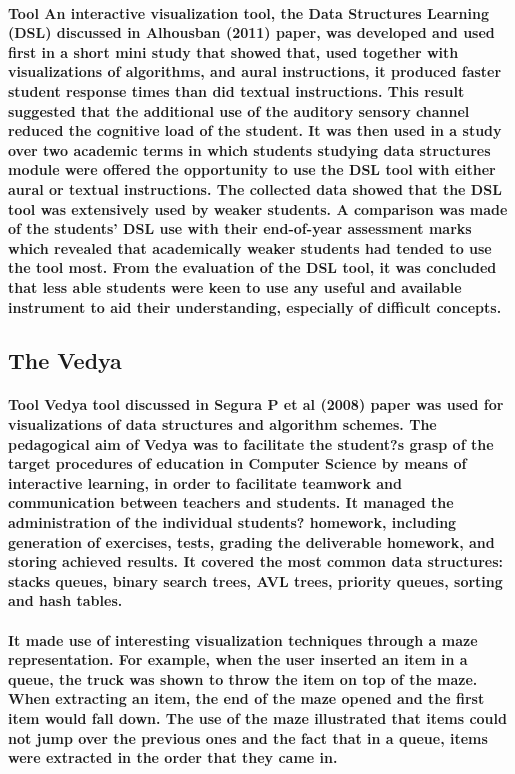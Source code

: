 \documentclass{article}
\begin{document}
\paragraph{Tool An interactive visualization tool, the Data Structures Learning (DSL) discussed in Alhousban (2011) paper\cite{kumar2017conceptualization}, was developed and used first in a short mini study that showed that, used together with visualizations of algorithms, and aural instructions, it produced faster student response times than did textual instructions. This result suggested that the additional use of the auditory sensory channel reduced the cognitive load of the student. It was then used in a study over two academic terms in which students studying data structures module were offered the opportunity to use the DSL tool with either aural or textual instructions. The collected data showed that the DSL tool was extensively used by weaker students. A comparison was made of the students' DSL use with their end-of-year assessment marks which revealed that academically weaker students had tended to use the tool most. From the evaluation of the DSL tool, it was concluded that less able students were keen to use any useful and available instrument to aid their understanding, especially of difficult concepts.}
\subsection{The Vedya}
\paragraph{Tool Vedya tool discussed in Segura P et al (2008) paper was used for visualizations of data structures and algorithm schemes. \cite{patel2014literature}The pedagogical aim of Vedya was to facilitate the student?s grasp of the target procedures of education in Computer Science by means of interactive learning, in order to facilitate teamwork and communication between teachers and students. It managed the administration of the individual students? homework, including generation of exercises, tests, grading the deliverable homework, and storing achieved results. It covered the most common data structures: stacks queues, binary search trees, AVL trees, priority queues, sorting and hash tables. }
\paragraph{It made use of interesting visualization techniques through a maze representation. For example, when the user inserted an item in a queue, the truck was shown to throw the item on top of the maze. When extracting an item, the end of the maze opened and the first item would fall down. The use of the maze illustrated that items could not jump over the previous ones and the fact that in a queue, items were extracted in the order that they came in. }
\end{document}
